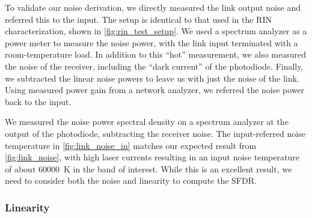 To validate our noise derivation, we directly measured the link output noise and referred this to the input.
The setup is identical to that used in the RIN characterization, shown in \autoref{fig:rin_test_setup}.
We used a spectrum analyzer as a power meter to measure the noise power, with the link input terminated with a room-temperature load.
In addition to this ``hot'' measurement, we also measured the noise of the receiver, including the ``dark current'' of the photodiode.
Finally, we subtracted the linear noise powers to leave us with just the noise of the link.
Using measured power gain from a network analyzer, we referred the noise power back to the input.


We measured the noise power spectral density on a spectrum analyzer at the output of the photodiode, subtracting the receiver noise.
The input-referred noise temperature in \autoref{fig:link_noise_in} matches our expected result from \autoref{fig:link_noise}, with high laser currents resulting in an input noise temperature of about \qty{60000}{\K} in the band of interest.
While this is an excellent result, we need to consider both the noise and linearity to compute the SFDR.

\subsubsection{Linearity}

